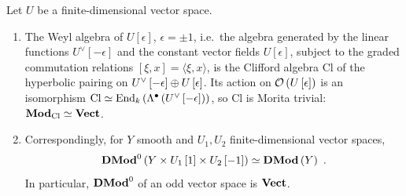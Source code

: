 \begin{prop}
\label{prop:odd}
Let $U$ be a finite-dimensional vector space.
\begin{enumerate}
\item The Weyl algebra of $U\left[\epsilon\right]$, $\epsilon=\pm1$, i.e.\ the algebra generated by the linear
functions $U^\vee\left[-\epsilon\right]$ and the constant vector fields $U\left[\epsilon\right]$, subject to
the graded commutation relations $\left[\xi,x\right]=\langle\xi,x\rangle$, is the Clifford algebra
$\mathrm{Cl}$ of the hyperbolic pairing on $U^\vee\left[-\epsilon\right]\oplus U\left[\epsilon\right]$. Its
action on $\mathcal{O}\left(U\left[\epsilon\right]\right)$ is an isomorphism
$\mathrm{Cl}\simeq\operatorname{End}_k\left(\Lambda^\bullet\left(U^\vee\left[-\epsilon\right]\right)\right)$, so
$\mathrm{Cl}$ is Morita trivial: $\mathbf{Mod}_{\mathrm{Cl}}\simeq\mathbf{Vect}$.
\item Correspondingly, for $Y$ smooth and $U_1,U_2$ finite-dimensional vector spaces,
\begin{equation*}
\mathbf{DMod}^0\left(Y\times U_1\left[1\right]\times U_2\left[-1\right]\right)\simeq\mathbf{DMod}\left(Y\right) \ .
\end{equation*}
In particular, $\mathbf{DMod}^0$ of an odd vector space is $\mathbf{Vect}$.
\end{enumerate}
\end{prop}

